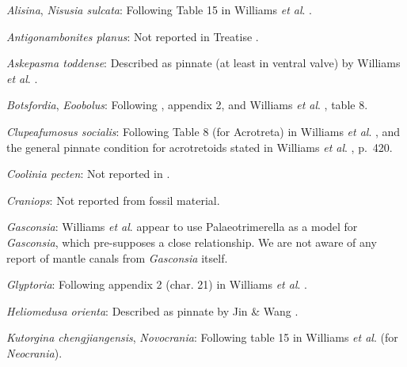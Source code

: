 \documentclass[openany]{book}
\theoremstyle{definition}
\theoremstyle{definition}
\theoremstyle{definition}
\theoremstyle{remark}
\begin{document}
\hypertarget{Alisina-coding-31}{}
\emph{Alisina}, \emph{Nisusia sulcata}: Following Table 15 in Williams
\emph{et al}. \citeyearpar{Williams2000LinguliformeaCraniiformea}.

\hypertarget{Antigonambonites_planus-coding-31}{}
\emph{Antigonambonites planus}: Not reported in Treatise
\citep{Williams2000LinguliformeaCraniiformea}.

\hypertarget{Askepasma_toddense-coding-31}{}
\emph{Askepasma toddense}: Described as pinnate (at least in ventral
valve) by Williams \emph{et al}.
\citeyearpar[p.~250]{Williams1998Thediversity}.

\hypertarget{Botsfordia-coding-31}{}
\emph{Botsfordia}, \emph{Eoobolus}: Following
\citet{Williams1998Thediversity}, appendix 2, and Williams \emph{et al}.
\citeyearpar{Williams2000LinguliformeaCraniiformea}, table 8.

\hypertarget{Clupeafumosus_socialis-coding-31}{}
\emph{Clupeafumosus socialis}: Following Table 8 (for Acrotreta) in
Williams \emph{et al}.
\citeyearpar{Williams2000LinguliformeaCraniiformea}, and the general
pinnate condition for acrotretoids stated in Williams \emph{et al}.
\citeyearpar{Williams1997Introduction}, p.~420.

\hypertarget{Coolinia_pecten-coding-31}{}
\emph{Coolinia pecten}: Not reported in
\citet{Williams2000LinguliformeaCraniiformea}.

\hypertarget{Craniops-coding-31}{}
\emph{Craniops}: Not reported from fossil material.

\hypertarget{Gasconsia-coding-31}{}
\emph{Gasconsia}: Williams \emph{et al}. \citeyearpar[table
15]{Williams2000LinguliformeaCraniiformea} appear to use
Palaeotrimerella \citep[as drawn in][]{Williams1997Introduction} as a
model for \emph{Gasconsia}, which pre-supposes a close relationship. We
are not aware of any report of mantle canals from \emph{Gasconsia}
itself.

\hypertarget{Glyptoria-coding-31}{}
\emph{Glyptoria}: Following appendix 2 (char. 21) in Williams \emph{et
al}. \citeyearpar{Williams1998Thediversity}.

\hypertarget{Heliomedusa_orienta-coding-31}{}
\emph{Heliomedusa orienta}: Described as pinnate by Jin \& Wang
\citeyearpar{Jin1992Revisionof}.

\hypertarget{Kutorgina_chengjiangensis-coding-31}{}
\emph{Kutorgina chengjiangensis}, \emph{Novocrania}: Following table 15
in Williams \emph{et al}.
\citeyearpar{Williams2000LinguliformeaCraniiformea} (for
\emph{Neocrania}).
\end{document}
